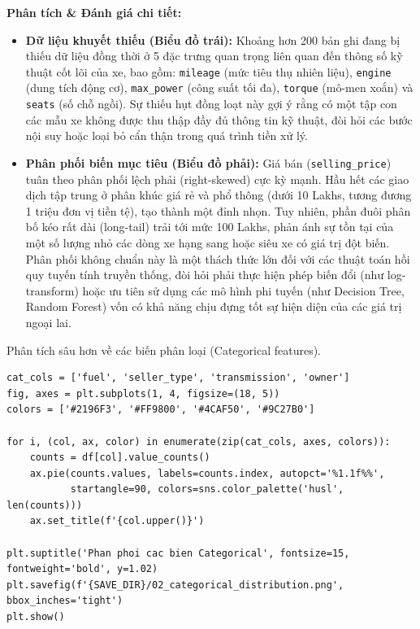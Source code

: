 \textbf{Phân tích \& Đánh giá chi tiết:}
\begin{itemize}
    \item \textbf{Dữ liệu khuyết thiếu (Biểu đồ trái):} Khoảng hơn 200 bản ghi đang bị thiếu dữ liệu đồng thời ở 5 đặc trưng quan trọng liên quan đến thông số kỹ thuật cốt lõi của xe, bao gồm: \texttt{mileage} (mức tiêu thụ nhiên liệu), \texttt{engine} (dung tích động cơ), \texttt{max\_power} (công suất tối đa), \texttt{torque} (mô-men xoắn) và \texttt{seats} (số chỗ ngồi). Sự thiếu hụt đồng loạt này gợi ý rằng có một tập con các mẫu xe không được thu thập đầy đủ thông tin kỹ thuật, đòi hỏi các bước nội suy hoặc loại bỏ cẩn thận trong quá trình tiền xử lý.
    \item \textbf{Phân phối biến mục tiêu (Biểu đồ phải):} Giá bán (\texttt{selling\_price}) tuân theo phân phối lệch phải (right-skewed) cực kỳ mạnh. Hầu hết các giao dịch tập trung ở phân khúc giá rẻ và phổ thông (dưới 10 Lakhs, tương đương 1 triệu đơn vị tiền tệ), tạo thành một đỉnh nhọn. Tuy nhiên, phần đuôi phân bố kéo rất dài (long-tail) trải tới mức 100 Lakhs, phản ánh sự tồn tại của một số lượng nhỏ các dòng xe hạng sang hoặc siêu xe có giá trị đột biến. Phân phối không chuẩn này là một thách thức lớn đối với các thuật toán hồi quy tuyến tính truyền thống, đòi hỏi phải thực hiện phép biến đổi (như log-transform) hoặc ưu tiên sử dụng các mô hình phi tuyến (như Decision Tree, Random Forest) vốn có khả năng chịu đựng tốt sự hiện diện của các giá trị ngoại lai.
\end{itemize}

Phân tích sâu hơn về các biến phân loại (Categorical features).

\begin{lstlisting}[style=pythoncode, caption={Phân tích các biến định tính}]
cat_cols = ['fuel', 'seller_type', 'transmission', 'owner']
fig, axes = plt.subplots(1, 4, figsize=(18, 5))
colors = ['#2196F3', '#FF9800', '#4CAF50', '#9C27B0']

for i, (col, ax, color) in enumerate(zip(cat_cols, axes, colors)):
    counts = df[col].value_counts()
    ax.pie(counts.values, labels=counts.index, autopct='%1.1f%%', 
           startangle=90, colors=sns.color_palette('husl', len(counts)))
    ax.set_title(f'{col.upper()}')

plt.suptitle('Phan phoi cac bien Categorical', fontsize=15, fontweight='bold', y=1.02)
plt.savefig(f'{SAVE_DIR}/02_categorical_distribution.png', bbox_inches='tight')
plt.show()
\end{lstlisting}

